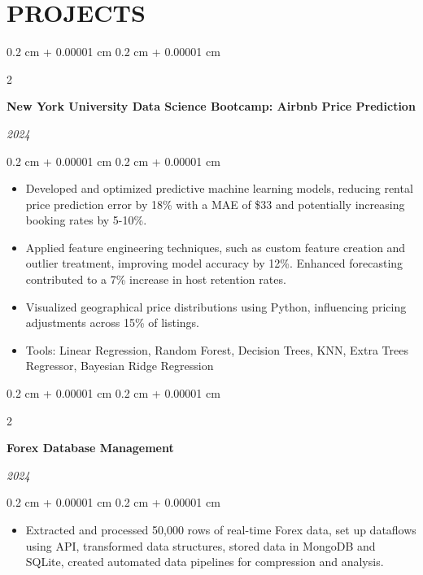 \documentclass[10pt, letterpaper]{article}
\newenvironment{highlights}{
    \begin{itemize}[
        topsep=0.05 cm,
        parsep=0.05 cm,
        partopsep=0pt,
        itemsep=0pt,
        leftmargin=0.4 cm + 10pt
    ]
}{
    \end{itemize}
} %
\newenvironment{onecolentry}{
    \begin{adjustwidth}{
        0.2 cm + 0.00001 cm
    }{
        0.2 cm + 0.00001 cm
    }
}{
    \end{adjustwidth}
} %
\newenvironment{twocolentry}[2][]{
    \onecolentry
    \def\secondColumn{#2}
    \setcolumnwidth{\fill, 4.5 cm}
    \begin{paracol}{2}
}{
    \switchcolumn \raggedleft \secondColumn
    \end{paracol}
    \endonecolentry
} %
\begin{document}
    
    \section{PROJECTS}



        
        \begin{twocolentry}{     
            
        \textit{2024}}
            \textbf{New York University Data Science Bootcamp: Airbnb Price Prediction}
        \end{twocolentry}

        \vspace{0.10 cm}
        \begin{onecolentry}
            \begin{highlights}
                \item Developed and optimized predictive machine learning models, reducing rental price prediction error by 18\% with a MAE of \$33 and potentially increasing booking rates by 5-10\%.
                \item Applied feature engineering techniques, such as custom feature creation and outlier treatment, improving model accuracy by 12\%. Enhanced forecasting contributed to a 7\% increase in host retention rates.
                \item Visualized geographical price distributions using Python, influencing pricing adjustments across 15\% of listings. 
                \item Tools: Linear Regression, Random Forest, Decision Trees, KNN, Extra Trees Regressor, Bayesian Ridge Regression
            \end{highlights}
        \end{onecolentry}


        \vspace{0.2 cm}

        \begin{twocolentry}{
            
            
        \textit{2024}}
            \textbf{Forex Database Management}
        \end{twocolentry}

        \vspace{0.10 cm}
        \begin{onecolentry}
            \begin{highlights}
                \item Extracted and processed 50,000 rows of real-time Forex data, set up dataflows using API, transformed data structures, stored data in MongoDB and SQLite, created automated data pipelines for compression and analysis.
            \end{highlights}
        \end{onecolentry}
        
\end{document}
